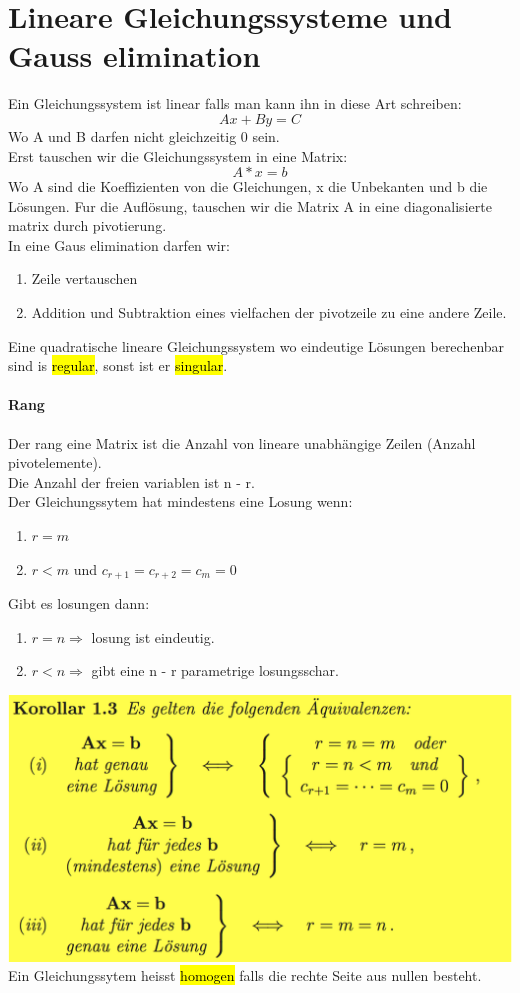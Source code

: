 \documentclass[11pt]{article}
\newcommand\back[1][-3cm]{\hspace*{#1}}
\begin{document}
\section{Lineare Gleichungssysteme und Gauss elimination}
Ein Gleichungssystem ist linear falls man kann ihn in diese Art schreiben:
\begin{equation}
	Ax+By=C
\end{equation}
Wo A und B darfen nicht gleichzeitig 0 sein.\\
Erst tauschen wir die Gleichungssystem in eine Matrix:
\begin{equation}
	A*x=b
\end{equation}
Wo A sind die Koeffizienten von die Gleichungen, x die Unbekanten und b die Lösungen.
Fur die Auflösung, tauschen wir die Matrix A in eine diagonalisierte matrix durch pivotierung.\\
In eine Gaus elimination darfen wir:
\begin{enumerate}
	\item Zeile vertauschen
	\item Addition und Subtraktion eines vielfachen der pivotzeile zu eine andere Zeile.
\end{enumerate}
Eine quadratische lineare Gleichungssystem wo eindeutige Lösungen berechenbar sind is \hl{regular}, sonst ist er \hl{singular}.
\paragraph{Rang}
Der rang eine Matrix ist die Anzahl von lineare unabhängige Zeilen (Anzahl pivotelemente).\\Die Anzahl der freien variablen ist n - r.\\
Der Gleichungssytem hat mindestens eine Losung wenn:
\begin{enumerate}
	\item $r = m$
	\item  $r < m$ und $c_{r+1} = c_{r+2} = c_m = 0$
\end{enumerate}
Gibt es losungen dann:
\begin{enumerate}
	\item $r = n \Rightarrow$ losung ist eindeutig.
	\item $r < n \Rightarrow$ gibt eine n - r parametrige losungsschar.
\end{enumerate}
\back\includegraphics{images/gauss}\\
Ein Gleichungssytem heisst \hl{homogen} falls die rechte Seite aus nullen besteht.
\end{document}
